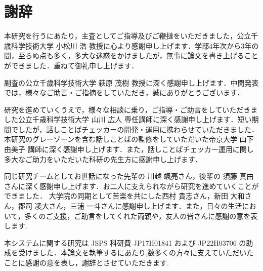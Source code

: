 \chapter*{謝辞}

本研究を行うにあたり，主査としてご指導及びご鞭撻をいただきました，公立千歳科学技術大学 小松川 浩 教授に心より感謝申し上げます．学部4年次から3年の間，至らぬ点も多く，多大な迷惑をかけましたが，無事に論文を書き上げることができました．重ねて御礼申し上げます．

副査の公立千歳科学技術大学 萩原 茂樹 教授に深く感謝申し上げます．中間発表では，様々なご助言・ご指摘をしていただき，誠にありがとうございます．

研究を進めていくうえで，様々な相談に乗り，ご指導・ご助言をしていただきました公立千歳科学技術大学 山川 広人 専任講師に深く感謝申し上げます．短い期間でしたが，話しことばチェッカーの開発・運用に携わらせていただきました．本研究のグレーゾーンを含む話しことばの監修をしていただいた帝京大学 山下 由美子 講師に深く感謝申し上げます．また，話しことばチェッカー運用に関し多大なご助力をいただいた科研の先生方に感謝申し上げます．

同じ研究チームとしてお世話になった先輩の 川越 颯亮さん，後輩の 須藤 真由 さんに深く感謝申し上げます．お二人に支えられながら研究を進めていくことができました．
大学院の同期として苦楽を共にした西村 貴志さん，新田 大和さん，郡司 凌大さん，三浦 一斗さんに感謝申し上げます．また，日々の生活において，多くのご支援，ご助言をしてくれた両親や，友人の皆さんに感謝の意を表します.

本システムに関する研究は JSPS 科研費 JP17H01841 および JP22H03706 の助成を受けました．本論文を執筆するにあたり,数多くの方々に支えていただいたことに感謝の意を表し，謝辞とさせていただきます.